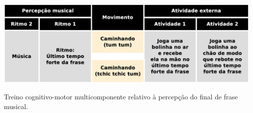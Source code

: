 \begin{table}[!h]
  \centering
    \includegraphics[width=1.0\textwidth]{chapters/cap-body-control/treino-bolinha3.eps}
\caption{Treino cognitivo-motor multicomponente relativo à percepção do final de frase musical.}
\label{tab:treino-bolinha3}
\end{table}



